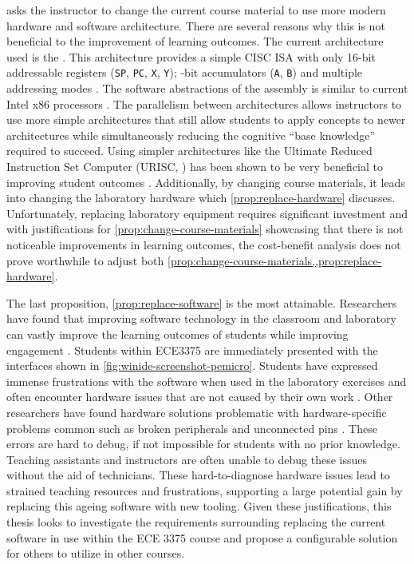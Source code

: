  asks the instructor to change the current course material to use more modern hardware and software architecture. There are several reasons why this is not beneficial to the improvement of learning outcomes. The current architecture used is the \hcmodel{}. This architecture provides a simple CISC ISA with only  16-bit addressable registers (\verb|SP|, \verb|PC|, \verb|X|, \verb|Y|);  -bit accumulators (\verb|A|, \verb|B|) and multiple addressing modes \cite{hc12Manual2006}. The software abstractions of the \hcmodel{} assembly is similar to current Intel\textregistered{} x86 processors \cite{intel2017}. The parallelism between architectures allows instructors to use more simple architectures that still allow students to apply concepts to newer architectures while simultaneously reducing the cognitive ``base knowledge'' required to succeed. Using simpler architectures like the Ultimate Reduced Instruction Set Computer (URISC, \cite{Mavaddat1988}) has been shown to be very beneficial to improving student outcomes \cite{Nakamura2013, McLoughlin2010, Mavaddat1988, Djordjevic2005, Garcia2009}. Additionally, by changing course materials, it leads into changing the laboratory hardware which \cref{prop:replace-hardware} discusses. Unfortunately, replacing laboratory equipment requires significant investment and with justifications for \cref{prop:change-course-materials} showcasing that there is not noticeable improvements in learning outcomes, the cost-benefit analysis does not prove worthwhile to adjust both \cref{prop:change-course-materials,,prop:replace-hardware}.

The last proposition, \cref{prop:replace-software} is the most attainable. Researchers have found that improving software technology in the classroom and laboratory can vastly improve the learning outcomes of students while improving engagement \cite{Ackovska2014, Stolikj2011, Ristov2011, Ristov2014, Nikolic2009, Skillen2011, Tappan2009, Djordjevic2005, cec2016}. Students within ECE3375 are immediately presented with the interfaces shown in \cref{fig:winide-screenshot-pemicro}. Students have expressed immense frustrations with the software when used in the laboratory exercises and often encounter hardware issues that are not caused by their own work \cite{evals:ece3375-2013, evals:ece3375-2014}. Other researchers have found hardware solutions problematic with hardware-specific problems common such as broken peripherals and unconnected pins \cite{Ackovska2014}. These errors are hard to debug, if not impossible for students with no prior knowledge. Teaching assistants and instructors are often unable to debug these issues without the aid of technicians. These hard-to-diagnose hardware issues lead to strained teaching resources and frustrations, supporting a large potential gain by replacing this ageing software with new tooling. Given these justifications, this thesis looks to investigate the requirements surrounding replacing the current software in use within the ECE 3375 course and propose a configurable solution for others to utilize in other courses. 

